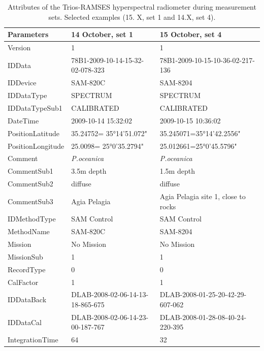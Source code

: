 \documentclass[11pt]{article}
\begin{document}
\begin{appendices}
\begin{table}[H]\footnotesize
	\caption{Attributes of the Trios-RAMSES hyperspectral radiometer during measurement sets. Selected examples (15. X, set 1 and 14.X, set 4).}\label{tab:A.2}	\centering
	\begin{tabular}{| p{3cm} | p{3cm} | p{5cm} |}
	\hline
	    \textbf{Parameters} & \textbf{14 October, set 1} & \textbf{15 October, set 4} \\ \hline \hline
	     Version &1 & 1 \\ \hline
	     IDData & 78B1-2009-10-14-15-32-02-078-323 & 78B1-2009-10-15-10-36-02-217-136 \\ \hline
	     IDDevice & SAM-820C & SAM-8204\\ \hline
	     IDDataType & SPECTRUM & SPECTRUM \\ \hline
	     IDDataTypeSub1 & CALIBRATED & CALIBRATED \\ \hline
	      DateTime & 2009-10-14 15:32:02 & 2009-10-15 10:36:02 \\ \hline
	     PositionLatitude & 35.24752= 35°14'51.072" & 35.245071=35°14'42.2556" \\ \hline
	     PositionLongitude & 25.0098= 25°0'35.2794" & 25.012661=25°0'45.5796" \\ \hline
	     Comment & \textit{P.oceanica} & \textit{P.oceanica} \\ \hline
	     CommentSub1 & 3.5m depth & 1.5m depth \\ \hline
	     CommentSub2 & diffuse & diffuse \\ \hline
	     CommentSub3 & Agia Pelagia & Agia Pelagia site 1, close to rocks \\ \hline
	     IDMethodType & SAM Control & SAM Control \\ \hline
	    MethodName & SAM-820C & SAM-8204 \\ \hline
	    Mission & No Mission & No Mission \\ \hline
	    MissionSub & 1 & 1 \\ \hline
	    RecordType & 0 & 0 \\ \hline
	    CalFactor & 1 & 1 \\ \hline
	   IDDataBack & DLAB-2008-02-06-14-13-18-865-675 & DLAB-2008-01-25-20-42-29-607-062 \\ \hline
	   IDDataCal & DLAB-2008-02-06-14-23-00-187-767 & DLAB-2008-01-28-08-40-24-220-395 \\ \hline
	   IntegrationTime & 64 & 32 \\ \hline

\end{tabular}
\end{table}
\end{appendices}
\end{document}
